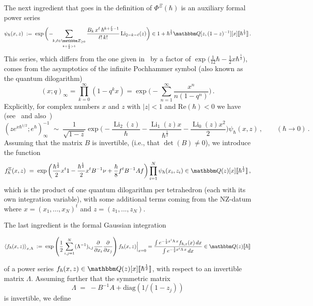 \documentclass[12pt,reqno]{amsart}
\theoremstyle{definition}
\def\BZ{\mathbbm Z}
\def\BQ{\mathbbm Q}
\def\Re{\mathrm{Re}}
\def\be{\begin{equation}}
\def\ee{\end{equation}}
\def\diag{\mathrm{diag}}
\def\hb{\hbar}
\newcommand{\bea}{\begin{equation}\begin{aligned}}
\newcommand{\eea}{\end{aligned}\end{equation}}
\renewcommand{\=}{\;=\;}
\newcommand{\Li}{\operatorname{Li}}
\newcommand{\hroot}{\hbar^{\frac{1}{2}}}
\begin{document}
The next ingredient that goes in the definition of $\Phi^\Xi(\hbar)$ is an
auxiliary formal power series
\be
\label{psih}
  \psi_{\hbar}(x,z)
  \;:=\;
  \exp\bigg(\!-\!\!\sum_{\underset{k+\frac{\ell}{2}>1}{k,\ell\in\BZ_{\geq0}}}
  \frac{B_{k}\,x^{\ell}\,\hbar^{k+\frac{\ell}{2}-1}}{\ell!\,k!}\Li_{2-k-\ell}(z)\bigg)
  \in1+\hbar^{\frac{1}{2}}\BQ[z,(1-z)^{-1}][x]\llbracket\hbar^{\frac{1}{2}}
  \rrbracket\,.
\ee
This series, which differs from the one given in~\cite[Eq. 1.9]{DG} by a factor of
$\exp\big(\frac{1}{12}\hbar-\frac{1}{2}x\hbar^{\frac{1}{2}}\big)$, comes from
the asymptotics of the infinite Pochhammer symbol (also known as the
quantum dilogarithm)
\be
\label{poch}
(x;q)_\infty = \prod_{k=0}^\infty (1-q^k x) = \exp\Big(
-\sum_{n=1}^\infty \frac{x^n}{n(1-q^n)} \Big) \,.
\ee
Explicitly, for complex numbers $x$ and $z$ with $|z|<1$ and
$\Re(\hbar)<0$ we have (see~\cite{Zagier:dilog} and
also~\cite[Lem.2.1]{GZ:asymptotics})
\be
\label{eq.qpoch.asy.psi}
  (ze^{x\hbar^{1/2}};e^{\hbar})_{\infty}^{-1}
  \;\sim\;
  \frac{1}{\sqrt{1-z}}\exp\Big(-\frac{\Li_{2}(z)}{\hbar}
  -\frac{\Li_{1}(z)x}{\hbar^{\frac{1}{2}}}
  -\frac{\Li_{0}(z)x^2}{2}\Big)
  \psi_{\hbar}(x,z)\,, \qquad (\hbar\rightarrow 0) \,.
\ee
Assuming that the matrix $B$ is invertible, (i.e., that $\det(B) \neq 0$),
we introduce the function
\be
\label{integrand}
f^\Xi_{\hb}(x,z) \=
\exp \bigg(\frac{\hbar^{\frac12}}{2} x^t1-\frac{\hbar^{\frac12}}{2} x^t  B^{-1} \nu
+\frac\hbar8 f^t B^{-1} A f \bigg) 
\prod_{i=1}^N \psi_{\hb}(x_i,z_i) \in \BQ(z)[x]\llbracket \hbar^{\frac12} \rrbracket\,,
\ee
which is the product of one quantum dilogarithm per tetrahedron (each
with its own integration variable), 
with some additional terms coming from the NZ-datum
where $x=(x_1,...,x_N)^t$ and $z=(z_1,...,z_N)$.

The last ingredient is the formal Gaussian integration~\cite{BIZ}  
\begin{small}
\bea
\label{FGI}
\left\langle
f_\hbar(x,z)
\right\rangle_{x,\Lambda}
\;:=\; \exp\left(
{\frac 1 2 \sum_{i,j=1}^N (\Lambda^{-1})_{i,j}
\frac{\partial}{\partial x_i}
\frac{\partial}{\partial x_j}}\right)
f_\hbar(x,z) \Big|_{x=0} =
\frac{\int e^{-\frac12x^t \Lambda \,x}f_{\hb,z}(x) \, dx}{
  \int e^{-\frac12x^t \Lambda \,x} \, dx}
\in \BQ(z)\llbracket \hbar \rrbracket
\eea
\end{small}
of a power series $f_\hbar(x,z) \in \BQ(z)[x]\llbracket\hroot \rrbracket$, with
respect to an invertible matrix $\Lambda$. Assuming further that the symmetric
matrix
\be
\label{lambda}
\Lambda \= - B^{-1} A + \diag(1/(1-z_j))
\ee
is invertible, we define 
\end{document}
